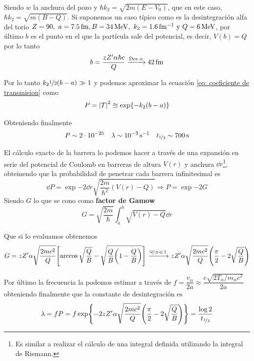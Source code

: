 Siendo $w$ la anchura del pozo y $\hbar k_2=\sqrt{2m(E-V_0)}$, que en este caso, $\hbar k_2=\sqrt{m(B-Q)}$. Si suponemos un caso típico como es la desintegración alfa del torio $Z=90, \ a=\unit[7.5]{fm},\\  B=\unit[34]{MeV},\  k_2=\unit[1.6]{fm^{-1}} \ \text{y} \ Q=\unit[6]{MeV}$, por último $b$ es el punto en el que la partícula sale del potencial, es decir, $V(b)=Q$ por lo tanto $$b=\frac{zZ^\prime\alpha \hbar c}{Q}\xrightarrow[]{\text{Des }\alpha}\unit[42]{fm}$$

Por lo tanto $k_2\nicefrac{1}{2}(b-a)\gg 1$ y podemos aproximar la ecuación \ref{eq: coeficiente de transmision} como $$P=\abs{T}^2\approxeq \exp{-k_2(b-a)}$$

Obteniendo finalmente $$P\sim 2\cdot 10^{-25} \quad \lambda \sim \unit[10^{-3}]{s^{-1}} \quad t_{\nicefrac{1}{2}}\sim \unit[700]{s}$$

El cálculo exacto de la barrera lo podemos hacer a través de una expansión en serie del potencial de Coulomb en barreras de altura $V(r)$ y anchura $\dd r$\footnote{Es similar a realizar el cálculo de una integral definida utilizando la integral de Riemann.}, obteinendo que la probabilidad de penetrar cada barrera infinitesimal es
\begin{equation}
    \dd P=\exp{-2 \dd r \sqrt{\frac{2m}{\hbar^2}(V(r)-Q)}} \Rightarrow P= \exp{-2G}
    \label{eq: probabilidad de transicion barrera de coulomb}
\end{equation}
Siendo $G$ lo que se cono como \textbf{factor de Gamow}
\begin{equation*}
    G=\sqrt{\frac{2m}{\hbar}} \int ^b _a \sqrt{V(r)-Q} \dd r
\end{equation*}

Que si lo evaluamos obtenemos
\begin{equation}
    G=zZ^\prime \alpha \sqrt{\frac{2mc^2}{Q}}\qty[\arccos{\sqrt{\frac{Q}{B}}}-\sqrt{\frac{Q}{B}\qty(1-\frac{Q}{B})}]\xrightarrow[]{\nicefrac{Q}{B}\ll 1} zZ^\prime \alpha \sqrt{\frac{2mc^2}{Q}}\qty(\frac{\pi}{2}-2\sqrt{\frac{Q}{B}})
    \label{eq: factor de Gamow}
\end{equation}

Por último la frecuencia la podemos estimar a través de $f=\dfrac{v_\alpha}{2a}\approx \dfrac{c \sqrt{2T_\alpha/m_\alpha c^2}}{2a}$ obteniendo finalmente que la constante de desintegración es 
\begin{equation}
    \lambda= f P= f\exp{-2zZ^\prime \alpha \sqrt{\frac{2mc^2}{Q}}\qty(\frac{\pi}{2}-2\sqrt{\frac{Q}{B}})}=\frac{\log 2}{t_{\nicefrac{1}{2}}} 
    \label{eq: anchura de desintegracion emision de nucleos analitica}
\end{equation}

